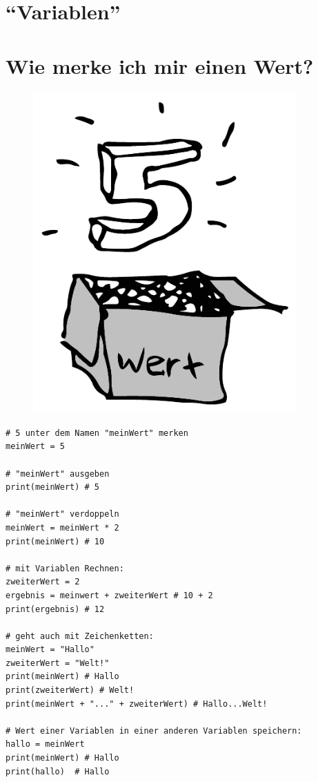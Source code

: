 



	\begin{center}
		\section*{\enquote{Variablen}}
		\section*{Wie merke ich mir einen Wert?}	
	\end{center}
	
	
	\begin{figure}[htbp]
		\centering
		\includegraphics[width=0.9\textwidth]{img/variablen.pdf}
		\label{variablen}
	\end{figure}
	
	
	\newpage
	
	\begin{lstlisting}
# 5 unter dem Namen "meinWert" merken
meinWert = 5

# "meinWert" ausgeben
print(meinWert) # 5

# "meinWert" verdoppeln
meinWert = meinWert * 2
print(meinWert) # 10

# mit Variablen Rechnen:
zweiterWert = 2
ergebnis = meinwert + zweiterWert # 10 + 2
print(ergebnis) # 12

# geht auch mit Zeichenketten:
meinWert = "Hallo"
zweiterWert = "Welt!"
print(meinWert) # Hallo
print(zweiterWert) # Welt!
print(meinWert + "..." + zweiterWert) # Hallo...Welt!

# Wert einer Variablen in einer anderen Variablen speichern:
hallo = meinWert
print(meinWert) # Hallo
print(hallo)  # Hallo
	\end{lstlisting}
	
	
	
